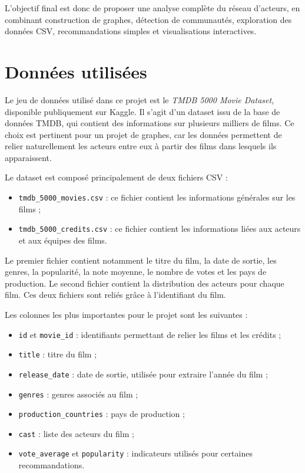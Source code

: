 \documentclass[11pt,a4paper,oneside,openany]{report}
\begin{document}
L’objectif final est donc de proposer une analyse complète du réseau d’acteurs, en combinant construction de graphes, détection de communautés, exploration des données CSV, recommandations simples et visualisations interactives.

\chapter{Données utilisées}

Le jeu de données utilisé dans ce projet est le \textit{TMDB 5000 Movie Dataset}, disponible publiquement sur Kaggle. Il s’agit d’un dataset issu de la base de données TMDB, qui contient des informations sur plusieurs milliers de films. Ce choix est pertinent pour un projet de graphes, car les données permettent de relier naturellement les acteurs entre eux à partir des films dans lesquels ils apparaissent.

Le dataset est composé principalement de deux fichiers CSV :

\begin{itemize}
    \item \texttt{tmdb\_5000\_movies.csv} : ce fichier contient les informations générales sur les films ;
    \item \texttt{tmdb\_5000\_credits.csv} : ce fichier contient les informations liées aux acteurs et aux équipes des films.
\end{itemize}

Le premier fichier contient notamment le titre du film, la date de sortie, les genres, la popularité, la note moyenne, le nombre de votes et les pays de production. Le second fichier contient la distribution des acteurs pour chaque film. Ces deux fichiers sont reliés grâce à l’identifiant du film.

Les colonnes les plus importantes pour le projet sont les suivantes :

\begin{itemize}
    \item \texttt{id} et \texttt{movie\_id} : identifiants permettant de relier les films et les crédits ;
    \item \texttt{title} : titre du film ;
    \item \texttt{release\_date} : date de sortie, utilisée pour extraire l’année du film ;
    \item \texttt{genres} : genres associés au film ;
    \item \texttt{production\_countries} : pays de production ;
    \item \texttt{cast} : liste des acteurs du film ;
    \item \texttt{vote\_average} et \texttt{popularity} : indicateurs utilisés pour certaines recommandations.
\end{itemize}
\end{document}
